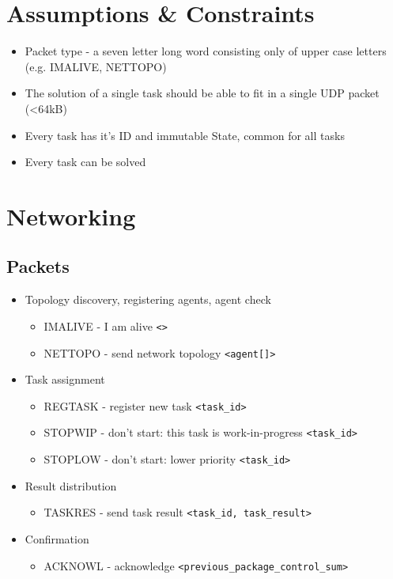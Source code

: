\documentclass{article}
\begin{document}
\section{Assumptions \& Constraints}
\begin{itemize}
    \item Packet type - a seven letter long word consisting only of upper case letters (e.g. IMALIVE, NETTOPO)
    \item The solution of a single task should be able to fit in a single UDP packet (<64kB)
    \item Every task has it's ID and immutable State, common for all tasks
    \item Every task can be solved
\end{itemize}

\section{Networking}
\subsection{Packets}

\begin{itemize}
    \item Topology discovery, registering agents, agent check
    \begin{itemize}
        \item IMALIVE - I am alive \verb!<>!
        \item NETTOPO - send network topology \verb!<agent[]>!
    \end{itemize}
    \item Task assignment
    \begin{itemize}
        \item REGTASK - register new task \verb!<task_id>!
        \item STOPWIP - don't start: this task is work-in-progress \verb!<task_id>!
        \item STOPLOW - don't start: lower priority \verb!<task_id>!
    \end{itemize}
    \item Result distribution
    \begin{itemize}
        \item TASKRES - send task result \verb!<task_id, task_result>!
    \end{itemize}
    \item Confirmation
    \begin{itemize}
        \item ACKNOWL - acknowledge \verb!<previous_package_control_sum>!
    \end{itemize}
\end{itemize}
\end{document}
